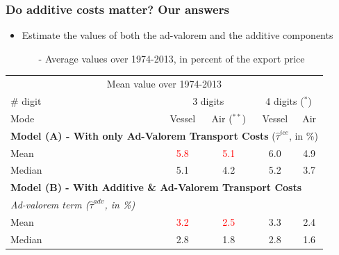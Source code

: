 \documentclass[10 pt,Helvetica, french]{beamer}
\begin{document}
\begin{frame}[label=slide_results_summary]
\frametitle{Do additive costs matter? Our answers}
\begin{itemize}
\item Estimate the values of both the ad-valorem and the additive components \vspace{0.1cm}
\begin{itemize}
\item[-] \footnotesize{Average values over 1974-2013, in percent of the export price \hyperlink{app_results_summary}{}  } \vspace{0.1cm}
\end{itemize}
\end{itemize}
\begin{table}[htbp]
  \centering
  \scriptsize{
 \begin{center}
    \begin{tabular}{l|cc|cc}
      \hline \hline
    \multicolumn{5}{c}{Mean value over 1974-2013}   \\
    \# digit & \multicolumn{2}{c}{3 digits} & \multicolumn{2}{c}{4 digits ($^\ast$)} \\ \hline
    Mode  & Vessel & Air ($^{\ast \ast}$) & Vessel & Air \\ \hline
    \multicolumn{5}{l}{\textbf{Model (A) - With only Ad-Valorem Transport Costs} ($\widehat{\tau}^{ice}$, in \%)}  \\ \hline
    Mean  & \textcolor{red}{5.8} & \textcolor{red}{5.1} & 6.0 & 4.9 \\
    Median & 5.1 & 4.2 & 5.2 & 3.7 \\ \hline
    \multicolumn{5}{l}{\textbf{Model (B) - With Additive \& Ad-Valorem Transport Costs} } \\ \hline
   \textit{Ad-valorem term ($\widehat{\tau}^{adv}$, in \%)} & & & & \\ \hline
    Mean  & \textcolor{red}{3.2} & \textcolor{red}{2.5} & 3.3 & 2.4 \\
    Median & 2.8 & 1.8 & 2.8 & 1.6 \\ \hline

\end{tabular}
\end{center}}
\end{table}
\end{frame}
\end{document}
